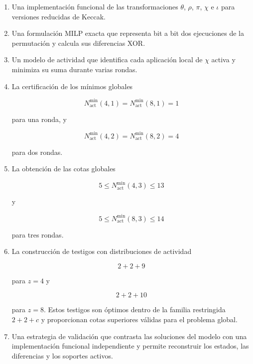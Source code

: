 \begin{enumerate}
    \item Una implementación funcional de las transformaciones
    $\theta$, $\rho$, $\pi$, $\chi$ e $\iota$ para versiones reducidas de
    Keccak.

    \item Una formulación MILP exacta que representa bit a bit dos
    ejecuciones de la permutación y calcula sus diferencias XOR.

    \item Un modelo de actividad que identifica cada aplicación local de
    $\chi$ activa y minimiza su suma durante varias rondas.

    \item La certificación de los mínimos globales

    \[
    N_{\mathrm{act}}^{\min}(4,1)
    =
    N_{\mathrm{act}}^{\min}(8,1)
    =
    1
    \]

    para una ronda, y

    \[
    N_{\mathrm{act}}^{\min}(4,2)
    =
    N_{\mathrm{act}}^{\min}(8,2)
    =
    4
    \]

    para dos rondas.

    \item La obtención de las cotas globales

    \[
    5
    \leq
    N_{\mathrm{act}}^{\min}(4,3)
    \leq
    13
    \]

    y

    \[
    5
    \leq
    N_{\mathrm{act}}^{\min}(8,3)
    \leq
    14
    \]

    para tres rondas.

    \item La construcción de testigos con distribuciones de actividad

    \[
    2+2+9
    \]

    para $z=4$ y

    \[
    2+2+10
    \]

    para $z=8$. Estos testigos son óptimos dentro de la familia restringida
    $2+2+c$ y proporcionan cotas superiores válidas para el problema
    global.

    \item Una estrategia de validación que contrasta las soluciones del
    modelo con una implementación funcional independiente y permite
    reconstruir los estados, las diferencias y los soportes activos.
\end{enumerate}


